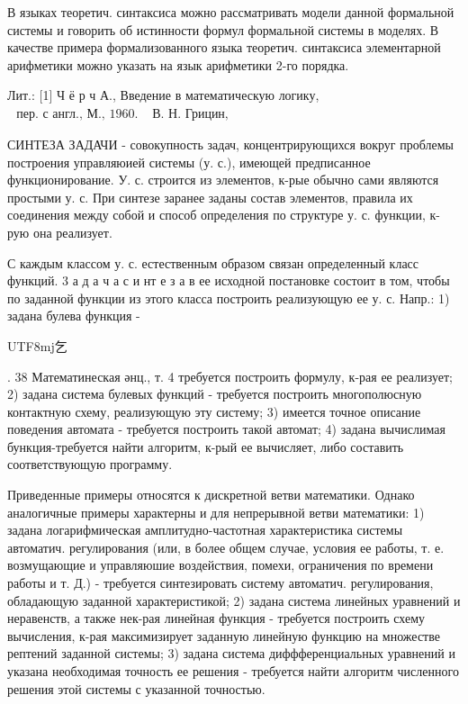 \documentclass[10pt]{article}
\begin{document}
В языках теоретич. синтаксиса можно рассматривать модели данной формальной системы и говорить об истинности формул формальной системы в моделях. В качестве примера формализованного языка теоретич. синтаксиса элементарной арифметики можно указать на язык арифметики 2-го порядка.



Лит.: [1] Ч ё р ч А., Введение в математическую логику, $\begin{aligned} \text { пер. с англ., М., } 1960 . & \text { В. Н. Грицин, }\end{aligned}$



СИНТЕЗА ЗАДАЧИ - совокупность задач, концентрирующихся вокруг проблемы построения управляюией системы (у. с.), имеющей предписанное функционирование. У. с. строится из элементов, к-рые обычно сами являются простыми у. с. При синтезе заранее заданы состав элементов, правила их соединения между собой и способ определения по структуре у. с. функции, к-рую она реализует.



С каждым классом у. с. естественным образом связан определенный класс функций. 3 а д а ч а с и нт е з а в ее исходной постановке состоит в том, чтобы по заданной функции из этого класса построить реализующую ее у. с. Напр.: 1) задана булева функция -



\begin{CJK}{UTF8}{mj}乞\end{CJK}. 38 Математинеская әнц., т. 4 требуется построить формулу, к-рая ее реализует; 2) задана система булевых функций - требуется построить многополюсную контактную схему, реализующую эту систему; 3) имеется точное описание поведения автомата - требуется построить такой автомат; 4) задана вычислимая бункция-требуется найти алгоритм, к-рый ее вычисляет, либо составить соответствующую программу.



Приведенные примеры относятся к дискретной ветви математики. Однако аналогичные примеры характерны и для непрерывной ветви математики: 1) задана логарифмическая амплитудно-частотная характеристика системы автоматич. регулирования (или, в более общем случае, условия ее работы, т. е. возмущающие и управляюшие воздействия, помехи, ограничения по времени работы и т. Д.) - требуется синтезировать систему автоматич. регулирования, обладающую заданной характеристикой; 2) задана система линейных уравнений и неравенств, а также нек-рая линейная функция - требуется построить схему вычисления, к-рая максимизирует заданную линейную функцию на множестве рептений заданной системы; 3) задана система диффференциальных уравнений и указана необходимая точность ее решения - требуется найти алгоритм численного решения этой системы с указанной точностью.
\end{document}
